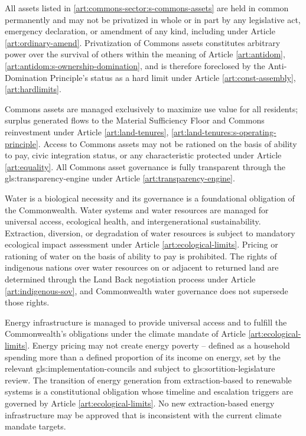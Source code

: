All assets listed in \ref{art:commons-sector:s-commons-assets} are held in common permanently and may not be privatized in whole or in part by any legislative act, emergency declaration, or amendment of any kind, including under Article \ref{art:ordinary-amend}. Privatization of Commons assets constitutes arbitrary power over the survival of others within the meaning of Article \ref{art:antidom}, \ref{art:antidom:s-ownership-domination}, and is therefore foreclosed by the Anti-Domination Principle's status as a hard limit under Article \ref{art:const-assembly}, \ref{art:hardlimits}.

Commons assets are managed exclusively to maximize use value for all residents; surplus generated flows to the Material Sufficiency Floor and Commons reinvestment under Article \ref{art:land-tenures}, \ref{art:land-tenures:s-operating-principle}. Access to Commons assets may not be rationed on the basis of ability to pay, civic integration status, or any characteristic protected under Article \ref{art:equality}. All Commons asset governance is fully transparent through the \gls{gls:transparency-engine} under Article \ref{art:transparency-engine}.

Water is a biological necessity and its governance is a foundational obligation of the Commonwealth. Water systems and water resources are managed for universal access, ecological health, and intergenerational sustainability. Extraction, diversion, or degradation of water resources is subject to mandatory ecological impact assessment under Article \ref{art:ecological-limits}. Pricing or rationing of water on the basis of ability to pay is prohibited. The rights of indigenous nations over water resources on or adjacent to returned land are determined through the Land Back negotiation process under Article \ref{art:indigenous-sov}, and Commonwealth water governance does not supersede those rights.

Energy infrastructure is managed to provide universal access and to fulfill the Commonwealth's obligations under the climate mandate of Article \ref{art:ecological-limits}. Energy pricing may not create energy poverty -- defined as a household spending more than a defined proportion of its income on energy, set by the relevant \gls{gls:implementation-councils} and subject to \gls{gls:sortition-legislature} review. The transition of energy generation from extraction-based to renewable systems is a constitutional obligation whose timeline and escalation triggers are governed by Article \ref{art:ecological-limits}. No new extraction-based energy infrastructure may be approved that is inconsistent with the current climate mandate targets.

